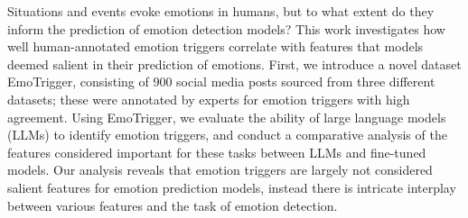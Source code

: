 Situations and events evoke emotions in humans, but to what extent do they inform the prediction of emotion detection models? This work investigates how well human-annotated emotion triggers correlate with features that models deemed salient in their prediction of emotions. First, we introduce a novel dataset EmoTrigger, consisting of 900 social media posts sourced from three different datasets; these were annotated by experts for emotion triggers with high agreement. Using EmoTrigger, we evaluate the ability of  large language models (LLMs) to identify emotion triggers, and conduct a comparative analysis of the features considered important for these tasks between LLMs and  fine-tuned models. Our analysis reveals that emotion triggers are largely not considered salient features for emotion prediction models, instead there is intricate interplay between various features and the task of emotion detection.